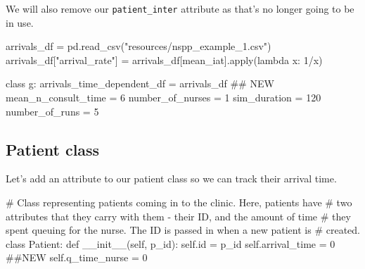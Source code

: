 \documentclass[
  letterpaper,
  DIV=11,
  numbers=noendperiod]{scrreprt}
\newenvironment{Shaded}{\begin{snugshade}}{\end{snugshade}}
\newcommand{\BuiltInTok}[1]{\textcolor[rgb]{0.00,0.23,0.31}{#1}}
\newcommand{\CommentTok}[1]{\textcolor[rgb]{0.37,0.37,0.37}{#1}}
\newcommand{\DecValTok}[1]{\textcolor[rgb]{0.68,0.00,0.00}{#1}}
\newcommand{\FunctionTok}[1]{\textcolor[rgb]{0.28,0.35,0.67}{#1}}
\newcommand{\KeywordTok}[1]{\textcolor[rgb]{0.00,0.23,0.31}{#1}}
\newcommand{\NormalTok}[1]{\textcolor[rgb]{0.00,0.23,0.31}{#1}}
\newcommand{\OperatorTok}[1]{\textcolor[rgb]{0.37,0.37,0.37}{#1}}
\newcommand{\StringTok}[1]{\textcolor[rgb]{0.13,0.47,0.30}{#1}}
\newcommand{\VariableTok}[1]{\textcolor[rgb]{0.07,0.07,0.07}{#1}}
\begin{document}
We will also remove our \texttt{patient\_inter} attribute as that's no
longer going to be in use.

\begin{Shaded}
\begin{Highlighting}[]
\NormalTok{arrivals\_df }\OperatorTok{=}\NormalTok{ pd.read\_csv(}\StringTok{"resources/nspp\_example\_1.csv"}\NormalTok{)}
\NormalTok{arrivals\_df[}\StringTok{"arrival\_rate"}\NormalTok{] }\OperatorTok{=}\NormalTok{ arrivals\_df[}\StringTok{\textquotesingle{}mean\_iat\textquotesingle{}}\NormalTok{].}\BuiltInTok{apply}\NormalTok{(}\KeywordTok{lambda}\NormalTok{ x: }\DecValTok{1}\OperatorTok{/}\NormalTok{x)}

\KeywordTok{class}\NormalTok{ g:}
\NormalTok{    arrivals\_time\_dependent\_df }\OperatorTok{=}\NormalTok{ arrivals\_df  }\CommentTok{\#\# NEW}
\NormalTok{    mean\_n\_consult\_time }\OperatorTok{=} \DecValTok{6}
\NormalTok{    number\_of\_nurses }\OperatorTok{=} \DecValTok{1}
\NormalTok{    sim\_duration }\OperatorTok{=} \DecValTok{120}
\NormalTok{    number\_of\_runs }\OperatorTok{=} \DecValTok{5}
\end{Highlighting}
\end{Shaded}

\subsection{Patient class}\label{patient-class-1}

Let's add an attribute to our patient class so we can track their
arrival time.

\begin{Shaded}
\begin{Highlighting}[]
\CommentTok{\# Class representing patients coming in to the clinic.  Here, patients have}
\CommentTok{\# two attributes that they carry with them {-} their ID, and the amount of time}
\CommentTok{\# they spent queuing for the nurse.  The ID is passed in when a new patient is}
\CommentTok{\# created.}
\KeywordTok{class}\NormalTok{ Patient:}
    \KeywordTok{def} \FunctionTok{\_\_init\_\_}\NormalTok{(}\VariableTok{self}\NormalTok{, p\_id):}
        \VariableTok{self}\NormalTok{.}\BuiltInTok{id} \OperatorTok{=}\NormalTok{ p\_id}
        \VariableTok{self}\NormalTok{.arrival\_time }\OperatorTok{=} \DecValTok{0} \CommentTok{\#\#NEW}
        \VariableTok{self}\NormalTok{.q\_time\_nurse }\OperatorTok{=} \DecValTok{0}
\end{Highlighting}
\end{Shaded}
\end{document}
